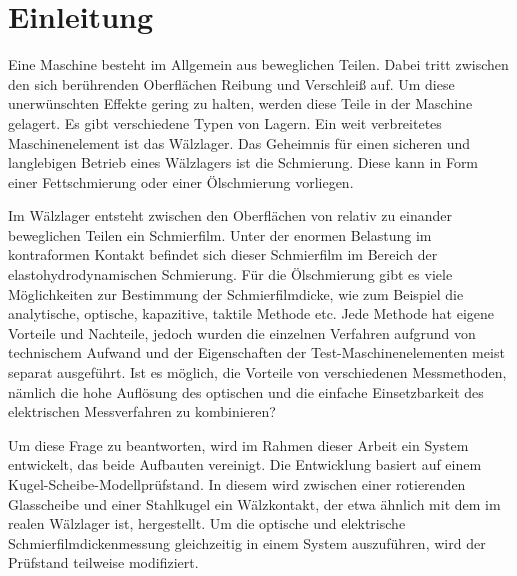 \chapter{Einleitung}
\label{chap:einleitung}

Eine Maschine besteht im Allgemein aus beweglichen Teilen.
Dabei tritt zwischen den sich berührenden Oberflächen Reibung und Verschleiß auf.
Um diese unerwünschten Effekte gering zu halten, werden diese Teile in der Maschine gelagert.
Es gibt verschiedene Typen von Lagern.
Ein weit verbreitetes Maschinenelement ist das Wälzlager.
Das Geheimnis für einen sicheren und langlebigen Betrieb eines Wälzlagers ist die Schmierung.
Diese kann in Form einer Fettschmierung oder einer Ölschmierung vorliegen.

Im Wälzlager entsteht zwischen den Oberflächen von relativ zu einander beweglichen Teilen ein Schmierfilm.
Unter der enormen Belastung im kontraformen Kontakt befindet sich dieser Schmierfilm im Bereich der elastohydrodynamischen Schmierung.
Für die Ölschmierung gibt es viele Möglichkeiten zur Bestimmung der Schmierfilmdicke, wie zum Beispiel die analytische, optische, kapazitive, taktile Methode etc.
Jede Methode hat eigene Vorteile und Nachteile, jedoch wurden die einzelnen Verfahren aufgrund von technischem Aufwand und der Eigenschaften der Test-Maschinenelementen meist separat ausgeführt.
Ist es möglich, die Vorteile von verschiedenen Messmethoden, nämlich die hohe Auflösung des optischen und die einfache Einsetzbarkeit des elektrischen Messverfahren zu kombinieren?

Um diese Frage zu beantworten, wird im Rahmen dieser Arbeit ein System entwickelt, das beide Aufbauten vereinigt.
Die Entwicklung basiert auf einem Kugel-Scheibe-Modellprüfstand.
In diesem wird zwischen einer rotierenden Glasscheibe und einer Stahlkugel ein Wälzkontakt, der etwa ähnlich mit dem im realen Wälzlager ist, hergestellt.
Um die optische und elektrische Schmierfilmdickenmessung gleichzeitig in einem System auszuführen, wird der Prüfstand teilweise modifiziert.

